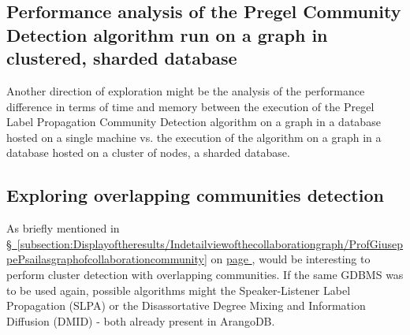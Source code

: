 \subsection[Performance analysis of the Pregel Community Detection algorithm run on a graph in cluster\-ed, shard\-ed da\-ta\-ba\-se]{Performance analysis of the \gls{Pregel} Community Detection algorithm run on a graph in cluster\-ed, shard\-ed da\-ta\-ba\-se} \label{subsection:Conclusions/Furtheravenuesofexploration/PerformanceanalysisofthePregelCommunityDetectionalgorithmrunonagraphinaclusteredshardeddatabase}
Another direction of exploration might be the analysis of the performance difference in terms of time and memory between the execution of the \gls{Pregel} Label Propagation Community Detection algorithm on a graph in a database hosted on a single machine vs. the execution of the algorithm on a graph in a database hosted on a cluster of nodes, a sharded database.

\subsection{Exploring overlapping communities detection} \label{subsection:Conclusions/Furtheravenuesofexploration/Exploringoverlappingcommunitiesdetection}
As briefly mentioned in \hyperref[subsection:Displayoftheresults/Indetailviewofthecollaborationgraph/ProfGiuseppePsailasgraphofcollaborationcommunity]{\S\ \ref{subsection:Displayoftheresults/Indetailviewofthecollaborationgraph/ProfGiuseppePsailasgraphofcollaborationcommunity}} on \hyperref[tobementionedinconclusions/Exploringoverlappingcommunitiesdetection]{page \pageref{tobementionedinconclusions/Exploringoverlappingcommunitiesdetection}}, would be interesting to perform cluster detection with overlapping communities.
If the same GDBMS was to be used again, possible algorithms might the Speaker-Listener Label Propagation (SLPA) or the Disassortative Degree Mixing and Information Diffusion (DMID) - both already present in ArangoDB.

\newpage
\thispagestyle{empty}
